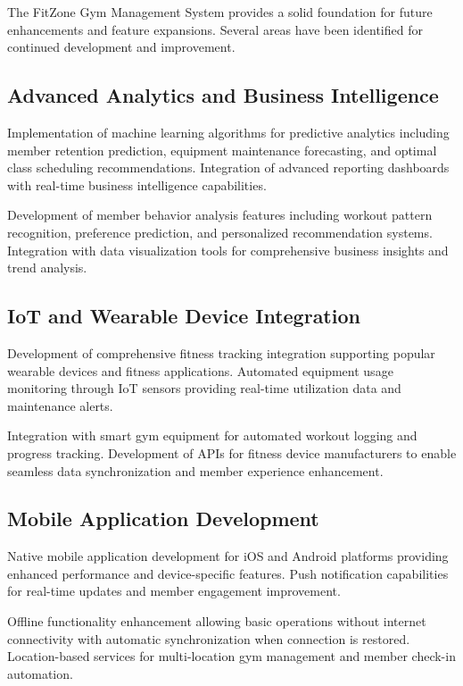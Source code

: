 \documentclass[12pt,a4paper]{report}
\begin{document}
The FitZone Gym Management System provides a solid foundation for future enhancements and feature expansions. Several areas have been identified for continued development and improvement.

\subsection{Advanced Analytics and Business Intelligence}

Implementation of machine learning algorithms for predictive analytics including member retention prediction, equipment maintenance forecasting, and optimal class scheduling recommendations. Integration of advanced reporting dashboards with real-time business intelligence capabilities.

Development of member behavior analysis features including workout pattern recognition, preference prediction, and personalized recommendation systems. Integration with data visualization tools for comprehensive business insights and trend analysis.

\subsection{IoT and Wearable Device Integration}

Development of comprehensive fitness tracking integration supporting popular wearable devices and fitness applications. Automated equipment usage monitoring through IoT sensors providing real-time utilization data and maintenance alerts.

Integration with smart gym equipment for automated workout logging and progress tracking. Development of APIs for fitness device manufacturers to enable seamless data synchronization and member experience enhancement.

\subsection{Mobile Application Development}

Native mobile application development for iOS and Android platforms providing enhanced performance and device-specific features. Push notification capabilities for real-time updates and member engagement improvement.

Offline functionality enhancement allowing basic operations without internet connectivity with automatic synchronization when connection is restored. Location-based services for multi-location gym management and member check-in automation.
\end{document}
